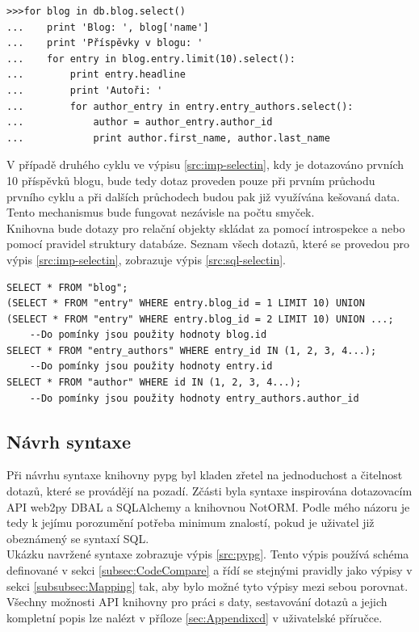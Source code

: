 \documentclass[ing,male,java,dept456]{diploma}						%
\begin{document}
\begin{lstlisting}[style=custompython, label=src:imp-selectin, caption={Návrh implementace samostatných dotazů v pypg}]
>>>for blog in db.blog.select()
...    print 'Blog: ', blog['name']
...    print 'Příspěvky v blogu: '
...    for entry in blog.entry.limit(10).select():
...        print entry.headline
...        print 'Autoři: '
...        for author_entry in entry.entry_authors.select():
...            author = author_entry.author_id
...            print author.first_name, author.last_name
\end{lstlisting}

V případě druhého cyklu ve výpisu \ref{src:imp-selectin}, kdy je dotazováno prvních 10 příspěvků blogu, bude tedy dotaz proveden pouze při prvním průchodu prvního cyklu a při dalších průchodech budou pak již využívána kešovaná data. Tento mechanismus bude fungovat nezávisle na počtu smyček. \\
Knihovna bude dotazy pro relační objekty skládat za pomocí introspekce a nebo pomocí pravidel struktury databáze. Seznam všech dotazů, které se provedou pro výpis \ref{src:imp-selectin}, zobrazuje výpis \ref{src:sql-selectin}.

\begin{lstlisting}[style=customsql, label=src:sql-selectin, caption={Dotazy vygenerované z výpisu \ref{src:imp-selectin} knihovnou pypg}]
SELECT * FROM "blog";
(SELECT * FROM "entry" WHERE entry.blog_id = 1 LIMIT 10) UNION  (SELECT * FROM "entry" WHERE entry.blog_id = 2 LIMIT 10) UNION ...; 
	--Do pomínky jsou použity hodnoty blog.id
SELECT * FROM "entry_authors" WHERE entry_id IN (1, 2, 3, 4...); 
	--Do pomínky jsou použity hodnoty entry.id
SELECT * FROM "author" WHERE id IN (1, 2, 3, 4...);
	--Do pomínky jsou použity hodnoty entry_authors.author_id
\end{lstlisting}

\subsection{Návrh syntaxe}

Při návrhu syntaxe knihovny pypg byl kladen zřetel na jednoduchost a čitelnost dotazů, které se provádějí na pozadí. Zčásti byla syntaxe inspirována dotazovacím API web2py DBAL a SQLAlchemy a knihovnou NotORM. Podle mého názoru je tedy k jejímu porozumění potřeba minimum znalostí, pokud je uživatel již obeznámený se syntaxí SQL. \\
Ukázku navržené syntaxe zobrazuje výpis \ref{src:pypg}. Tento výpis používá schéma definované v sekci \ref{subsec:CodeCompare} a řídí se stejnými pravidly jako výpisy v sekci \ref{subsubsec:Mapping} tak, aby bylo možné tyto výpisy mezi sebou porovnat. \\ 
Všechny možnosti API knihovny pro práci s daty, sestavování dotazů a jejich kompletní popis lze nalézt v příloze \ref{sec:Appendixcd} v uživatelské příručce.
\end{document}

